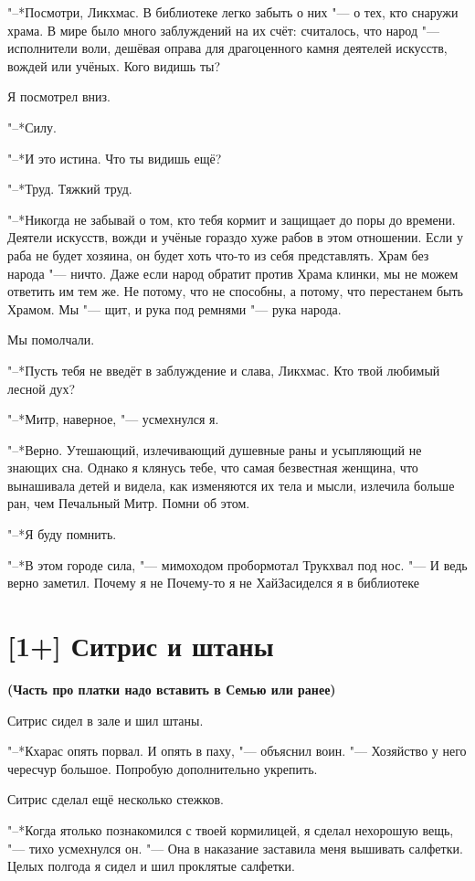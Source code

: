 "--*Посмотри, Ликхмас.
В библиотеке легко забыть о них "--- о тех, кто снаружи храма.
В мире было много заблуждений на их счёт: считалось, что народ "--- исполнители воли, дешёвая оправа для драгоценного камня деятелей искусств, вождей или учёных.
Кого видишь ты?

Я посмотрел вниз.

"--*Силу.

"--*И это истина.
Что ты видишь ещё?

"--*Труд.
Тяжкий труд.

"--*Никогда не забывай о том, кто тебя кормит и защищает до поры до времени.
Деятели искусств, вожди и учёные гораздо хуже рабов в этом отношении.
Если у раба не будет хозяина, он будет хоть что-то из себя представлять.
Храм без народа "--- ничто.
Даже если народ обратит против Храма клинки, мы не можем ответить им тем же.
Не потому, что не способны, а потому, что перестанем быть Храмом.
Мы "--- щит, и рука под ремнями "--- рука народа.

Мы помолчали.

"--*Пусть тебя не введёт в заблуждение и слава, Ликхмас.
Кто твой любимый лесной дух?

"--*Митр, наверное, "--- усмехнулся я.

"--*Верно.
Утешающий, излечивающий душевные раны и усыпляющий не знающих сна.
Однако я клянусь тебе, что самая безвестная женщина, что вынашивала детей и видела, как изменяются их тела и мысли, излечила больше ран, чем Печальный Митр.
Помни об этом.

"--*Я буду помнить.

"--*В этом городе сила, "--- мимоходом пробормотал Трукхвал под нос.
"--- И ведь верно заметил.
Почему я не\ldotsq
Почему-то я не\ldotst
Хай\ldotst Засиделся я в библиотеке\ldotst

\section{[1+] Ситрис и штаны}

\textbf{(Часть про платки надо вставить в Семью или ранее)}

Ситрис сидел в зале и шил штаны.

"--*Кхарас опять порвал.
И опять в паху, "--- объяснил воин.
"--- Хозяйство у него чересчур большое.
Попробую дополнительно укрепить.

Ситрис сделал ещё несколько стежков.

"--*Когда я\ldotst только познакомился с твоей кормилицей, я сделал нехорошую вещь, "--- тихо усмехнулся он.
"--- Она в наказание заставила меня вышивать салфетки.
Целых полгода я сидел и шил проклятые салфетки.

